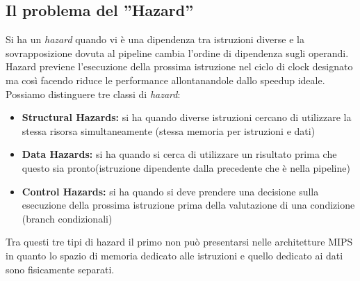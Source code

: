 \subsection{Il problema del ''Hazard''}
Si ha un \emph{hazard} quando vi è una dipendenza tra istruzioni diverse e la sovrapposizione dovuta al pipeline cambia l'ordine di dipendenza sugli operandi. Hazard previene l'esecuzione della prossima istruzione nel ciclo di clock designato ma così facendo riduce le performance allontanandole dallo speedup ideale.\\
Possiamo distinguere tre classi di \emph{hazard}:
\begin{itemize}
\item \textbf{Structural Hazards:} si ha quando diverse istruzioni cercano di utilizzare la stessa risorsa simultaneamente (stessa memoria per istruzioni e dati)
\item \textbf{Data Hazards:} si ha quando si cerca di utilizzare un risultato prima che questo sia pronto(istruzione dipendente dalla precedente che è nella pipeline)
\item \textbf{Control Hazards:} si ha quando si deve prendere una decisione sulla esecuzione della prossima istruzione prima della valutazione di una condizione (branch condizionali)
\end{itemize}
Tra questi tre tipi di hazard il primo non può presentarsi nelle architetture MIPS in quanto lo spazio di memoria dedicato alle istruzioni e quello dedicato ai dati sono fisicamente separati.
